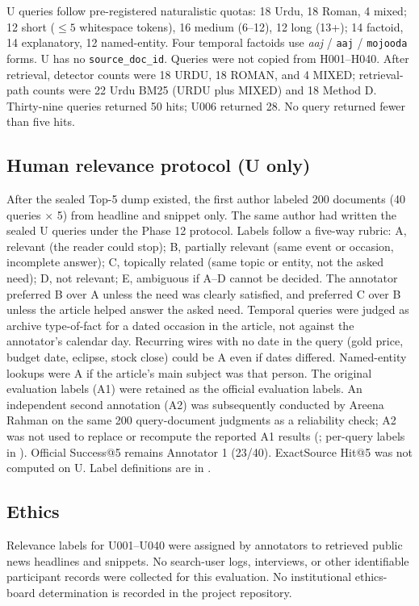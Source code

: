 \documentclass[10pt,letterpaper]{article}
\begin{document}
U queries follow pre-registered naturalistic quotas: 18 Urdu, 18 Roman, 4 mixed; 12 short ($\leq 5$ whitespace tokens), 16 medium (6--12), 12 long (13+); 14 factoid, 14 explanatory, 12 named-entity. Four temporal factoids use \emph{aaj} / \texttt{aaj} / \texttt{mojooda} forms. U has no \texttt{source\_doc\_id}. Queries were not copied from H001--H040. After retrieval, detector counts were 18 URDU, 18 ROMAN, and 4 MIXED; retrieval-path counts were 22 Urdu BM25 (URDU plus MIXED) and 18 Method D. Thirty-nine queries returned 50 hits; U006 returned 28. No query returned fewer than five hits.

\subsection*{Human relevance protocol (U only)}

After the sealed Top-5 dump existed, the first author labeled 200 documents (40 queries $\times$ 5) from headline and snippet only. The same author had written the sealed U queries under the Phase 12 protocol. Labels follow a five-way rubric: A, relevant (the reader could stop); B, partially relevant (same event or occasion, incomplete answer); C, topically related (same topic or entity, not the asked need); D, not relevant; E, ambiguous if A--D cannot be decided. The annotator preferred B over A unless the need was clearly satisfied, and preferred C over B unless the article helped answer the asked need. Temporal queries were judged as archive type-of-fact for a dated occasion in the article, not against the annotator's calendar day. Recurring wires with no date in the query (gold price, budget date, eclipse, stock close) could be A even if dates differed. Named-entity lookups were A if the article's main subject was that person. The original evaluation labels (A1) were retained as the official evaluation labels. An independent second annotation (A2) was subsequently conducted by Areena Rahman on the same 200 query-document judgments as a reliability check; A2 was not used to replace or recompute the reported A1 results (; per-query labels in ). Official Success@5 remains Annotator 1 (23/40). ExactSource Hit@5 was not computed on U. Label definitions are in .

\subsection*{Ethics}

Relevance labels for U001--U040 were assigned by annotators to retrieved public news headlines and snippets. No search-user logs, interviews, or other identifiable participant records were collected for this evaluation. No institutional ethics-board determination is recorded in the project repository.
\end{document}
